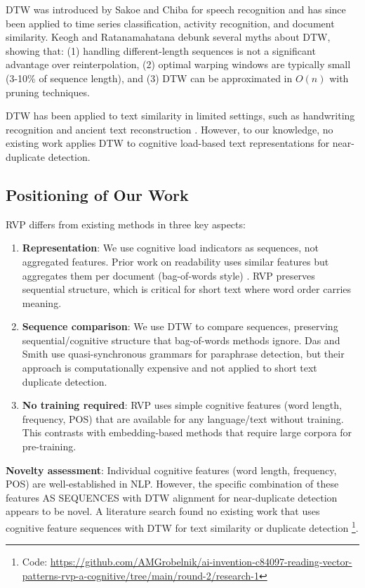 \documentclass[11pt,letterpaper]{article}
\begin{document}
DTW was introduced by Sakoe and Chiba \cite{Sakoe1978} for speech recognition and has since been applied to time series classification, activity recognition, and document similarity. Keogh and Ratanamahatana \cite{Ratanamahatana2005} debunk several myths about DTW, showing that: (1) handling different-length sequences is not a significant advantage over reinterpolation, (2) optimal warping windows are typically small (3-10\% of sequence length), and (3) DTW can be approximated in $O(n)$ with pruning techniques.

DTW has been applied to text similarity in limited settings, such as handwriting recognition and ancient text reconstruction \cite{Marukatat2004}. However, to our knowledge, no existing work applies DTW to cognitive load-based text representations for near-duplicate detection.

\subsection{Positioning of Our Work}

RVP differs from existing methods in three key aspects:

\begin{enumerate}
\item \textbf{Representation}: We use cognitive load indicators as sequences, not aggregated features. Prior work on readability uses similar features but aggregates them per document (bag-of-words style) \cite{Vajjala2012}. RVP preserves sequential structure, which is critical for short text where word order carries meaning.

\item \textbf{Sequence comparison}: We use DTW to compare sequences, preserving sequential/cognitive structure that bag-of-words methods ignore. Das and Smith \cite{Das2009} use quasi-synchronous grammars for paraphrase detection, but their approach is computationally expensive and not applied to short text duplicate detection.

\item \textbf{No training required}: RVP uses simple cognitive features (word length, frequency, POS) that are available for any language/text without training. This contrasts with embedding-based methods that require large corpora for pre-training.
\end{enumerate}

\textbf{Novelty assessment}: Individual cognitive features (word length, frequency, POS) are well-established in NLP. However, the specific combination of these features AS SEQUENCES with DTW alignment for near-duplicate detection appears to be novel. A literature search found no existing work that uses cognitive feature sequences with DTW for text similarity or duplicate detection \footnote{Code: \url{https://github.com/AMGrobelnik/ai-invention-c84097-reading-vector-patterns-rvp-a-cognitive/tree/main/round-2/research-1}}.
\end{document}
